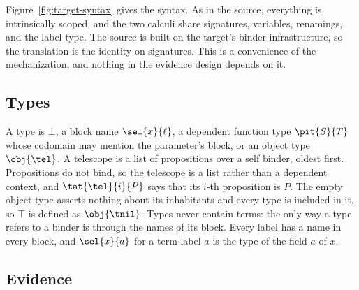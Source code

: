 Figure~\ref{fig:target-syntax} gives the syntax. As in the source, everything is intrinsically scoped, and the two calculi share signatures, variables, renamings, and the label type. The source is built on the target's binder infrastructure, so the translation is the identity on signatures. This is a convenience of the mechanization, and nothing in the evidence design depends on it.

\subsection{Types}

A type is $\bot$, a block name $\sel{x}{\ell}$, a dependent function type $\pit{S}{T}$ whose codomain may mention the parameter's block, or an object type $\obj{\tel}$. A telescope is a list of propositions over a self binder, oldest first. Propositions do not bind, so the telescope is a list rather than a dependent context, and $\tat{\tel}{i}{P}$ says that its $i$-th proposition is $P$. The empty object type asserts nothing about its inhabitants and every type is included in it, so $\top$ is defined as $\obj{\tnil}$. Types never contain terms: the only way a type refers to a binder is through the names of its block. Every label has a name in every block, and $\sel{x}{a}$ for a term label $a$ is the type of the field $a$ of $x$.

\subsection{Evidence}

